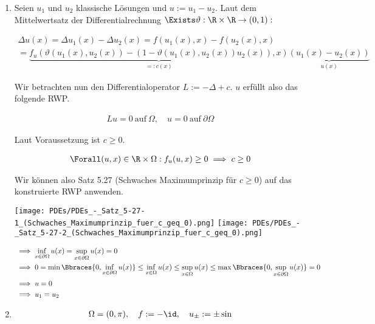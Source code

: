 \begin{solution}

\phantom{}

\begin{enumerate}[label = (\alph*)]

  \item Seien $u_1$ und $u_2$ klassische Lösungen und $u := u_1 - u_2$.
  Laut dem Mittelwertsatz der Differentialrechnung $\Exists \vartheta: \R \times \R \to (0, 1):$

  \begin{multline*}
    \Delta u(x)
    =
    \Delta u_1(x) - \Delta u_2(x)
    =
    f(u_1(x), x) - f(u_2(x), x) \\
    =
    \underbrace
    {
      f_u(\vartheta(u_1(x), u_2(x)) - (1 - \vartheta (u_1(x), u_2(x)) u_2(x)), x)
    }_{
      =: c(x)
    }
    \underbrace
    {
      (u_1(x) - u_2(x))
    }_{
      u(x)
    }
  \end{multline*}

  Wir betrachten nun den Differentialoperator $L := -\Delta + c$.
  $u$ erfüllt also das folgende RWP.

  \begin{align*}
    Lu = 0 ~\text{auf}~ \Omega,
    \quad
    u = 0 ~\text{auf}~ \partial \Omega
  \end{align*}

  Laut Voraussetzung ist $c \geq 0$.

  \begin{align*}
    \Forall (u, x) \in \R \times \Omega:
    f_u(u, x) \geq 0
    \implies
    c \geq 0
  \end{align*}

  Wir können also Satz 5.27 (Schwaches Maximumprinzip für $c \geq 0$) auf das konstruierte RWP anwenden.


  \begin{center}
    \texttt{[image: PDEs/PDEs\_-\_Satz\_5-27-1\_(Schwaches\_Maximumprinzip\_fuer\_c\_geq\_0).png]}
    \texttt{[image: PDEs/PDEs\_-\_Satz\_5-27-2\_(Schwaches\_Maximumprinzip\_fuer\_c\_geq\_0).png]}
  \end{center}

  \begin{align*}
    & \implies
    \inf_{x \in \partial \Omega} u(x)
    =
    \sup_{x \in \partial \Omega} u(x)
    =
    0 \\
    & \implies
    0
    =
    \min \Bbraces{0, \inf_{x \in \partial \Omega} u(x)}
    \leq
    \inf_{x \in \Omega} u(x)
    \leq
    \sup_{x \in \Omega} u(x)
    \leq
    \max \Bbraces{0, \sup_{x \in \partial \Omega} u(x)}
    =
    0 \\
    & \implies
    u = 0 \\
    & \implies
    u_1 = u_2
  \end{align*}
  \item
  \begin{align*}
    \Omega = (0, \pi),
    \quad
    f := -\id,
    \quad
    u_\pm := \pm \sin
  \end{align*}


\end{enumerate}
\end{solution}
